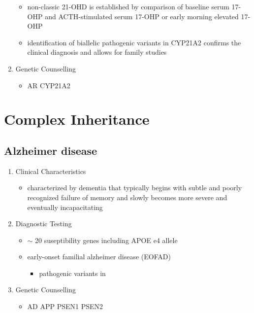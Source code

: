 \documentclass[12pt]{scrartcl}
\begin{document}
\begin{enumerate}
\begin{itemize}
\item non-classic 21-OHD is established by comparison of baseline serum
17-OHP and ACTH-stimulated serum 17-OHP or early morning elevated
17-OHP
\item identification of biallelic pathogenic variants in CYP21A2 confirms
the clinical diagnosis and allows for family studies
\end{itemize}
\item Genetic Counselling
\label{sec:org148a6e0}
\begin{itemize}
\item AR CYP21A2
\end{itemize}
\end{enumerate}

\section{Complex Inheritance}
\label{sec:org5eb8b75}
\subsection{Alzheimer disease}
\label{sec:org91dbe40}
\begin{enumerate}
\item Clinical Characteristics
\label{sec:org5694435}
\begin{itemize}
\item characterized by dementia that typically begins with subtle and
poorly recognized failure of memory and slowly becomes more severe
and eventually incapacitating
\end{itemize}
\item Diagnostic Testing
\label{sec:orgdab4ff2}
\begin{itemize}
\item \(\sim\) 20 suseptibility genes including APOE e4 allele
\item early-onset familial alzheimer disease (EOFAD)
\begin{itemize}
\item pathogenic variants in
\end{itemize}
\end{itemize}
\item Genetic Counselling
\label{sec:orgfcb04c8}
\begin{itemize}
\item AD APP PSEN1 PSEN2
\end{itemize}
\end{enumerate}
\end{document}

